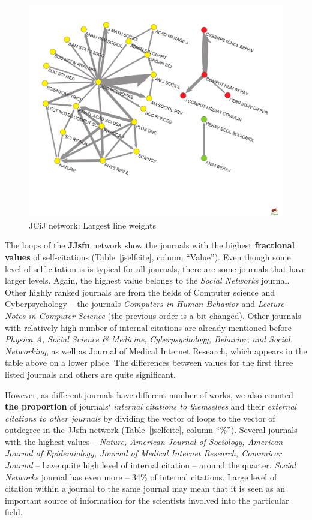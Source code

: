 \documentclass[11pt]{article} %
\begin{document}
\begin{figure}
\begin{center}
\includegraphics[width=150mm]{JCiJ_27.pdf}
\end{center}
\caption{JCiJ network: Largest line weights} \label{jcij}
\end{figure}
\medskip

The loops of the \textbf{JJsfn} network show the journals with the highest \textbf{fractional values} of self-citations (Table~\ref{jselfcite}, column ``Value''). Even though some level of self-citation is is typical for all journals, there are some journals that have larger levels. Again, the highest value belongs to the \textit{Social Networks} journal. Other highly ranked journals are from the fields of Computer science and Cyberpsychology -- the journals \textit{Computers in Human Behavior} and \textit{Lecture Notes in Computer Science} (the previous order is a bit changed). Other journals with relatively high number of internal citations are already mentioned before \textit{Physica A, Social Science \& Medicine}, \textit{Cyberpsychology, Behavior, and Social Networking}, as well as {Journal of Medical Internet Research}, which appears in the table above on a lower place. The differences between values for the first three listed journals and others are quite significant. \medskip 

However, as different journals have different number of works, we also counted \textbf{the proportion} of journals` \textit{internal citations to themselves} and their \textit{external citations to other journals} by dividing the vector of loops to the vector of outdegree in the JJsfn network (Table~\ref{jselfcite}, column ``\%''). Several journals with the highest values -- \textit{Nature, American Journal of Sociology, American Journal of Epidemiology, Journal of Medical Internet Research, Comunicar Journal} -- have quite high level of internal citation -- around the quarter. \textit{Social Networks} journal has even more -- 34\% of internal citations.  Large level of citation within a journal to the same journal may mean that it is seen as an important source of information for the scientists involved into the particular field.\medskip 
\end{document}
